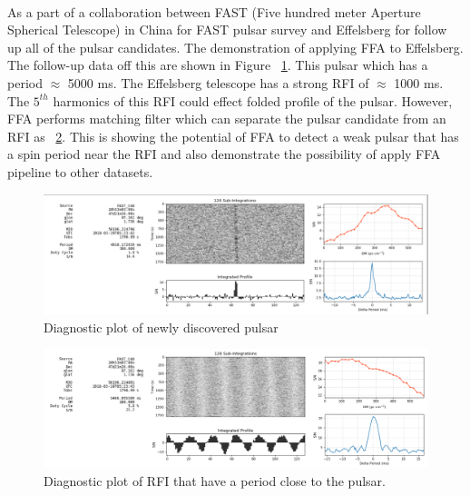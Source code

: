 \documentclass[thesis_msc.tex]{subfiles}
\begin{document}
    \paragraph{} As a part of a collaboration between FAST (Five hundred meter Aperture Spherical Telescope) in China for FAST pulsar survey and Effelsberg for follow up all of the pulsar candidates. The demonstration of applying FFA to Effelsberg. The follow-up data off this are shown in Figure ~\ref{Fast_pulsar}. This pulsar which has a period $\approx$ 5000 ms.  The Effelsberg telescope has a strong RFI of $\approx$ 1000 ms. The $5^{th}$ harmonics of this RFI could effect folded profile of the pulsar. However, FFA performs matching filter which can separate the pulsar candidate from an RFI as ~\ref{fast_rfi}. This is showing the potential of FFA to detect a weak pulsar that has a spin period near the RFI and also demonstrate the possibility of apply FFA pipeline to other datasets.     
    
    \begin{figure}[h]
\centering
\includegraphics[width=1.0\textwidth]{figures/FAST_pulsar.png}
\caption{Diagnostic plot of newly discovered pulsar}\label{Fast_pulsar}
\end{figure}

    \begin{figure}[h]
\centering
\includegraphics[width=1.0\textwidth]{figures/RFI_fast.png}
\caption{Diagnostic plot of RFI that have a period close to the pulsar.}\label{fast_rfi}
\end{figure}
\end{document}
